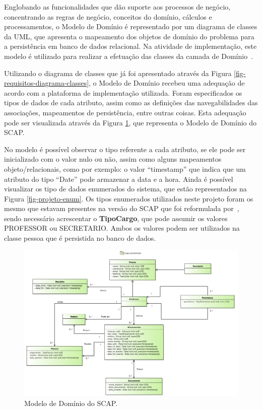 Englobando as funcionalidades que dão suporte aos processos de negócio, concentrando as regras de negócio, conceitos do domínio, cálculos e processamentos, o Modelo de Domínio é representado por um diagrama de classes da UML, que apresenta o mapeamento dos objetos de domínio do problema para a persistência em banco de dados relacional. Na atividade de implementação, este modelo é utilizado para realizar a efetuação das classes da camada de Domínio~\cite{souza:masterthesis07}.

Utilizando o diagrama de classes que já foi apresentado através da Figura \ref{fig-requisitos-diagrama-classes}, o Modelo de Domínio recebeu uma adequação de acordo com a plataforma de implementação utilizada. Foram especificados os tipos de dados de cada atributo, assim como as definições das navegabilidades das associações, mapeamentos de persistência, entre outras coisas. Esta adequação pode ser visualizada através da Figura \ref{fig-projeto-dominio}, que representa o Modelo de Domínio do SCAP.

No modelo é possível observar o tipo referente a cada atributo, se ele pode ser inicializado com o valor nulo ou não, assim como alguns mapeamentos objeto/relacionais, como por exemplo: o valor ``timestamp'' que indica que um atributo do tipo ``Date'' pode armazenar a data e a hora. Ainda é possível visualizar os tipo de dados enumerados do sistema, que estão representados na Figura \ref{fig-projeto-enum}. Os tipos enumerados utilizados neste projeto foram os mesmo que estavam presentes na versão do SCAP que foi reformulada por~, sendo necessário acrescentar o \textbf{TipoCargo}, que pode assumir os valores PROFESSOR ou SECRETARIO. Ambos os valores podem ser utilizados na classe pessoa que é persistida no banco de dados.   

\begin{figure}[h]
	\centering
	\includegraphics[scale=0.45]{figuras/fig-projeto-dominio} 
	\caption{Modelo de Domínio do SCAP.}
	\label{fig-projeto-dominio}
\end{figure}


